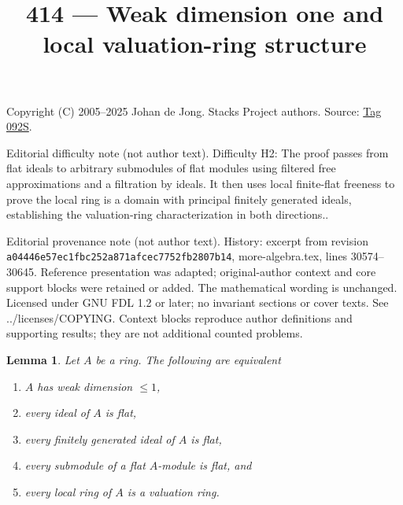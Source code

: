 \documentclass{amsart}
\theoremstyle{plain}
\newtheorem{lemma}[subsection]{Lemma}
\theoremstyle{definition}
\theoremstyle{remark}
\numberwithin{equation}{subsection}
\begin{document}
\title[Stacks Project, Tag 092S]{414 --- Weak dimension one and local valuation-ring structure}
\maketitle
\noindent Copyright (C) 2005--2025 Johan de Jong. Stacks Project authors. Source: \href{https://stacks.math.columbia.edu/tag/092S}{Tag 092S}.

\noindent Editorial difficulty note (not author text). Difficulty H2: The proof passes from flat ideals to arbitrary submodules of flat modules using filtered free approximations and a filtration by ideals. It then uses local finite-flat freeness to prove the local ring is a domain with principal finitely generated ideals, establishing the valuation-ring characterization in both directions..

\noindent Editorial provenance note (not author text). History: excerpt from revision \texttt{a0444\allowbreak 6e57e\allowbreak c1fbc\allowbreak 252a8\allowbreak 71afc\allowbreak ec775\allowbreak 2fb28\allowbreak 07b14}, more-algebra.tex, lines 30574--30645. Reference presentation was adapted; original-author context and core support blocks were retained or added. The mathematical wording is unchanged. Licensed under GNU FDL 1.2 or later; no invariant sections or cover texts. See ../licenses/COPYING. Context blocks reproduce author definitions and supporting results; they are not additional counted problems.

\begin{lemma}
\label{lemma-weak-dimension-at-most-1}
Let $A$ be a ring. The following are equivalent
\begin{enumerate}
\item $A$ has weak dimension $\leq 1$,
\item every ideal of $A$ is flat,
\item every finitely generated ideal of $A$ is flat,
\item every submodule of a flat $A$-module is flat, and
\item every local ring of $A$ is a valuation ring.
\end{enumerate}
\end{lemma}
\end{document}
